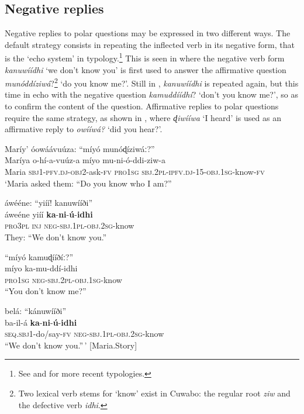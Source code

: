 \documentclass[output=paper,colorlinks=true, citecolor=brown,draftmode]{langscibook}
\begin{document}
\subsection{Negative replies}\label{sec:cuw:3.1}
Negative replies to polar questions may be expressed in two different ways. The default strategy consists in repeating the inflected verb in its negative form, that is the ‘echo system’ in  typology.\footnote{See \citet{EnfieldEtAl2018} and \citet{Moser2019} for more recent typologies.} This is seen in  where the negative verb form \textit{kanuwíídhi} ‘we don’t know you’ is first used to answer the affirmative question \textit{munóddíziwá}?\footnote{Two lexical verb stems for ‘know’ exist in Cuwabo: the regular root \textit{ziw} and the defective verb \textit{idhi}.} ‘do you know me?’. Still in , \textit{kanuwíídhi} is repeated again, but this time in echo with the negative question \textit{kamuddíídhí}? ‘don’t you know me?’, so as to confirm the content of the question. Affirmative replies to polar questions require the same strategy, as shown in , where \textit{ɖiwííwa} ‘I heard’ is used as an affirmative reply to \textit{owííwá?} ‘did you hear?’.

\ea\label{ex:cuw:52} Maríy’ óowáávuúza: “míyó munóɖíziwáː?”  \\ 
    \gll  Maríya o-hí{}-a-vuúz-a {\db}míyo mu-ni-ó{}-ddi-ziw-a\\
          Maria \textsc{sbj1-pfv.dj-obj2}{}-ask-\textsc{fv} {\db}\textsc{pro1sg} \textsc{sbj.2pl-ipfv.dj-15}{}-\textsc{obj.1sg}{}-know-\textsc{fv} \\
    \glt ‘Maria asked them: “Do you know who I am?”
    
\medskip áwééne: “yiíí! kanuwííði” \\
    \gll  áweéne {\db}yiíí \textbf{ka}{}-\textbf{ni}{}-\textbf{ú}{}-\textbf{idhi} \\
          \textsc{pro3pl} {\db}\textsc{inj} {\db}\textsc{neg-sbj.1pl-obj.2sg}{}-know  \\
    \glt    They: “We don’t know you.” 
    
\medskip “míyó kamuɖííðíː?” \\
    \gll  míyo ka-mu-ddí{}-idhi \\
           \textsc{pro1sg} \textsc{neg-sbj.2pl-obj.1sg}{}-know   \\
    \glt  [Maria] “You don’t know me?”
    
\medskip belá: “kánuwííði”\\
    \gll  ba-il-á {\db}\textbf{ka}{}-\textbf{ni}{}-\textbf{ú}{}-\textbf{idhi}  \\
          \textsc{seq.sbj1}{}-do/say-\textsc{fv} {\db}\textsc{neg-sbj.1pl-obj.2sg}{}-know   \\
    \glt   [They] “We don’t know you.”\,’ [Maria.Story]
\z
\end{document}
